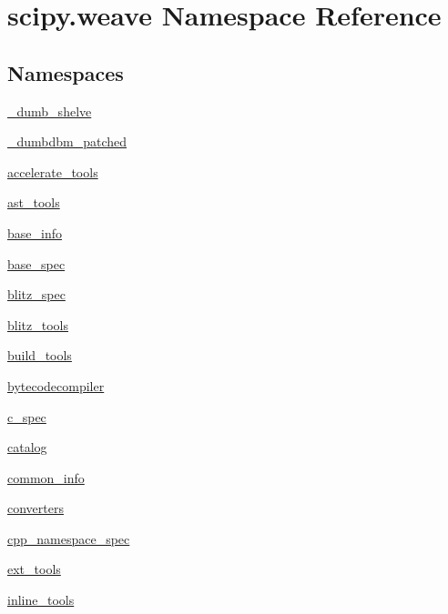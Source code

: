 \hypertarget{namespacescipy_1_1weave}{}\section{scipy.\+weave Namespace Reference}
\label{namespacescipy_1_1weave}
\subsection*{Namespaces}
\begin{DoxyCompactItemize}
\item 
 \hyperlink{namespacescipy_1_1weave_1_1__dumb__shelve}{\+\_\+dumb\+\_\+shelve}
\item 
 \hyperlink{namespacescipy_1_1weave_1_1__dumbdbm__patched}{\+\_\+dumbdbm\+\_\+patched}
\item 
 \hyperlink{namespacescipy_1_1weave_1_1accelerate__tools}{accelerate\+\_\+tools}
\item 
 \hyperlink{namespacescipy_1_1weave_1_1ast__tools}{ast\+\_\+tools}
\item 
 \hyperlink{namespacescipy_1_1weave_1_1base__info}{base\+\_\+info}
\item 
 \hyperlink{namespacescipy_1_1weave_1_1base__spec}{base\+\_\+spec}
\item 
 \hyperlink{namespacescipy_1_1weave_1_1blitz__spec}{blitz\+\_\+spec}
\item 
 \hyperlink{namespacescipy_1_1weave_1_1blitz__tools}{blitz\+\_\+tools}
\item 
 \hyperlink{namespacescipy_1_1weave_1_1build__tools}{build\+\_\+tools}
\item 
 \hyperlink{namespacescipy_1_1weave_1_1bytecodecompiler}{bytecodecompiler}
\item 
 \hyperlink{namespacescipy_1_1weave_1_1c__spec}{c\+\_\+spec}
\item 
 \hyperlink{namespacescipy_1_1weave_1_1catalog}{catalog}
\item 
 \hyperlink{namespacescipy_1_1weave_1_1common__info}{common\+\_\+info}
\item 
 \hyperlink{namespacescipy_1_1weave_1_1converters}{converters}
\item 
 \hyperlink{namespacescipy_1_1weave_1_1cpp__namespace__spec}{cpp\+\_\+namespace\+\_\+spec}
\item 
 \hyperlink{namespacescipy_1_1weave_1_1ext__tools}{ext\+\_\+tools}
\item 
 \hyperlink{namespacescipy_1_1weave_1_1inline__tools}{inline\+\_\+tools}
\item 

\end{DoxyCompactItemize}
